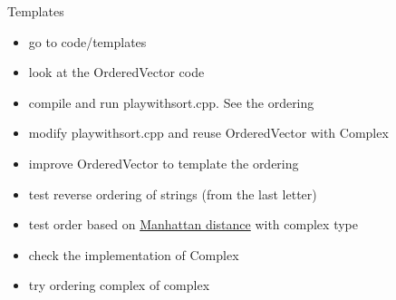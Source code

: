 \begin{frame}[fragile]
  \begin{exercise}{Templates}
    \begin{itemize}
    \item go to code/templates
    \item look at the OrderedVector code
    \item compile and run playwithsort.cpp. See the ordering
    \item modify playwithsort.cpp and reuse OrderedVector with Complex
    \item improve OrderedVector to template the ordering
    \item test reverse ordering of strings (from the last letter)
    \item test order based on {\color{blue} \href{https://en.wikipedia.org/wiki/Taxicab_geometry}{Manhattan distance}} with complex type
    \item check the implementation of Complex
    \item try ordering complex of complex
    \end{itemize}
  \end{exercise}
\end{frame}

